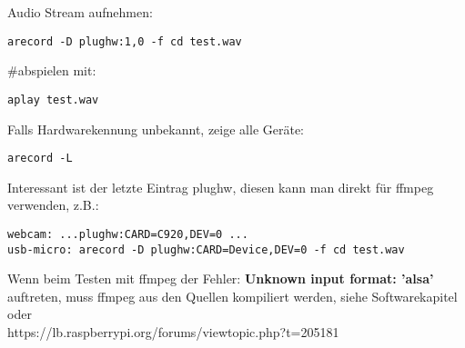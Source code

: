 Audio Stream aufnehmen:
\begin{verbatim}arecord -D plughw:1,0 -f cd test.wav\end{verbatim}
\#abspielen mit:
\begin{verbatim}aplay test.wav\end{verbatim}

Falls Hardwarekennung unbekannt, zeige alle Geräte:
\begin{verbatim}arecord -L\end{verbatim}
Interessant ist der letzte Eintrag plughw, diesen kann man direkt für
ffmpeg verwenden, z.B.:
\begin{verbatim}
webcam: ...plughw:CARD=C920,DEV=0 ...
usb-micro: arecord -D plughw:CARD=Device,DEV=0 -f cd test.wav
\end{verbatim}

Wenn beim Testen mit ffmpeg der Fehler: 
\textbf{Unknown input format: 'alsa'}\\ 
auftreten, muss ffmpeg aus den Quellen kompiliert werden, siehe 
Softwarekapitel oder\\ 
https://lb.raspberrypi.org/forums/viewtopic.php?t=205181


 